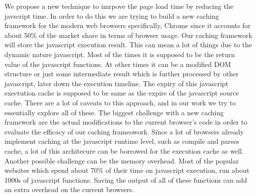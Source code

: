 We propose a new technique to imrpove the page load time by reducing the javscript time. 
In order to do this we are trying to build a new caching framework for the modern web browsers
specifically, Chrome  since it accounts for about 50\% of the market share in terms of browser
usage. Our caching framework will store the javascript execution result. This can mean a lot of things
due to the dynamic nature javascript. Most of the times it is supposed to be the return value of the 
javascript functions. At other times it can be a modified DOM structure or just some intermediate result which
is further processed by other javascript, later down the execution timeline. 
The expiry of this javascript exectution cache is supposed to be same as the expire of the javascript source cache. 
There are a lot of caveats to this approach, and in our work we try to essentially explore all of these. 
The biggest challenge with a new caching framework are the actual modifications to the current browser's code 
in order to evaluate the efficacy of our caching frameowork. Since a lot of browsers already implement caching
at the javascript runtime level, such as compile and parses cache, a lot of this architecure can be borrowed
for the execution cache as well. 
Another possible challenge can be the memory overhead. Most of the popular websites which spend about 70\% 
of their time on javascript execution, run about 1000s of javascript functions. Saving the output of all 
of these functions can add an extra overhead on the current browsers. 
